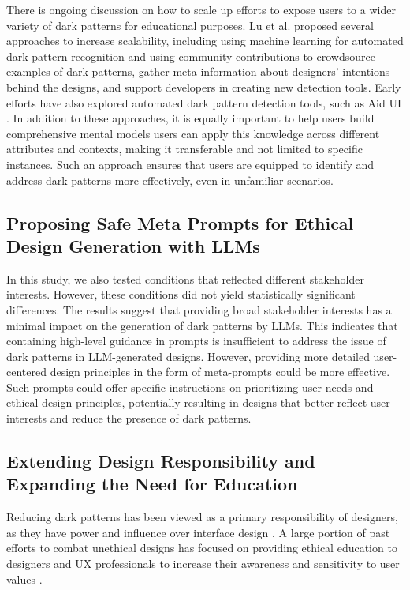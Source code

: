 There is ongoing discussion on how to scale up efforts to expose users to a wider variety of dark patterns for educational purposes. Lu et al. \cite{a:56} proposed several approaches to increase scalability, including using machine learning for automated dark pattern recognition and using community contributions to crowdsource examples of dark patterns, gather meta-information about designers' intentions behind the designs, and support developers in creating new detection tools. Early efforts have also explored automated dark pattern detection tools, such as Aid UI \cite{a:66}. In addition to these approaches, it is equally important to help users build comprehensive mental models users can apply this knowledge across different attributes and contexts, making it transferable and not limited to specific instances. Such an approach ensures that users are equipped to identify and address dark patterns more effectively, even in unfamiliar scenarios.

\subsection{Proposing Safe Meta Prompts for Ethical Design Generation with LLMs}
In this study, we also tested conditions that reflected different stakeholder interests. However, these conditions did not yield statistically significant differences. The results suggest that providing broad stakeholder interests has a minimal impact on the generation of dark patterns by LLMs. %
This indicates that containing high-level guidance in prompts is insufficient to address the issue of dark patterns in LLM-generated designs. %
However, providing more detailed user-centered design principles in the form of meta-prompts could be more effective. Such prompts could offer specific instructions on prioritizing user needs and ethical design principles, potentially resulting in designs that better reflect user interests and reduce the presence of dark patterns.

\subsection{Extending Design Responsibility and Expanding the Need for Education}
Reducing dark patterns has been viewed as a primary responsibility of designers, as they have power and influence over interface design \cite{a:43, a:49}. A large portion of past efforts to combat unethical designs has focused on providing ethical education to designers and UX professionals to increase their awareness and sensitivity to user values \cite{a:53, a:54, a:55}. 

